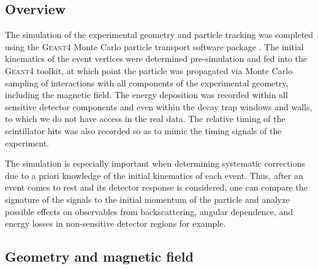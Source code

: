 \subsection{Overview}

The simulation of the experimental geometry and particle tracking was completed
using the \textsc{Geant4} Monte Carlo particle transport software package
\cite{agostinelli2003geant4}. The initial kinematics of the event vertices
were determined pre-simulation and fed into the \textsc{Geant4} toolkit, at which
point the particle was propagated via Monte Carlo sampling of interactions
with all components of the experimental geometry, including the magnetic field.
The energy deposition was recorded within all sensitive detector components and
even within the decay trap windows and walls, to which we do not have access
in the real data. The relative timing of the scintillator hits was also
recorded so as to mimic the timing signals of the experiment.

The simulation is especially important when determining systematic corrections due
to a priori knowledge of the initial kinematics of each event. Thus, after an event
comes to rest and its detector response is considered, one can compare the signature
of the signals to the initial momentum of the particle and analyze possible
effects on observables from backscattering, angular dependence, and energy losses
in non-sensitive detector regions for example.

\subsection{Geometry and magnetic field} \label{sssec:simMagField}

